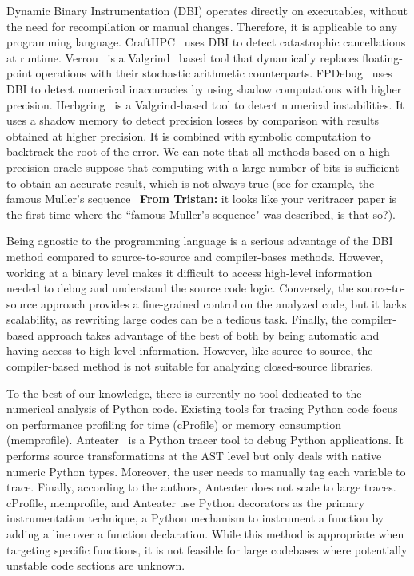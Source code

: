 \documentclass[11pt]{article}
\newcommand{\tristan}[1]{\color{orange}\textbf{From Tristan:} #1\color{black}\xspace}
\begin{document}
Dynamic Binary Instrumentation (DBI) operates directly on executables, without the need for recompilation or manual changes. Therefore, it is applicable to any programming language.
CraftHPC~\cite{lam2013dynamic} uses DBI to detect catastrophic cancellations at runtime.
Verrou~\cite{fevotte2016verrou} is a Valgrind~\cite{nethercote2007valgrind} based tool that dynamically replaces
floating-point operations with their stochastic arithmetic counterparts. FPDebug~\cite{benz2012dynamic} uses DBI to detect numerical inaccuracies by using shadow computations with higher precision.
Herbgring~\cite{sanchez2017finding} is a Valgrind-based tool to detect
numerical instabilities. It uses a shadow memory to detect precision losses by comparison with results obtained at higher precision. It is combined with symbolic computation to backtrack the root of the error.
We can note that all methods based on a high-precision oracle suppose that computing with a large number of bits is sufficient to obtain an accurate result, which is not always true (see for example, the famous Muller's sequence~\cite{chatelain2018veritracer} \tristan{it looks like your veritracer paper is the first time where the ``famous Muller's sequence" was described, is that so?}).

Being agnostic to the programming language is a serious advantage of the DBI method compared to source-to-source and compiler-bases methods. However, working at a binary level makes it difficult to access high-level information needed to debug and understand the source code logic. Conversely, the source-to-source approach provides a fine-grained control on the analyzed code, but it lacks scalability, as rewriting large codes can be a tedious task. Finally, the compiler-based approach takes advantage of the best of both by being automatic and having access to high-level information. However, like source-to-source, the compiler-based method is not suitable for analyzing closed-source libraries.

To the best of our knowledge, there is currently no tool dedicated to the numerical analysis of Python code. Existing tools for tracing Python code focus on  performance profiling for time (cProfile) 
or memory consumption (memprofile). 
Anteater~\cite{faust2019anteater} is a Python tracer tool to debug Python applications. 
It performs source transformations at the AST level but only deals with native numeric Python types.
Moreover, the user needs to manually tag each variable to trace. Finally, according to the authors, Anteater does not scale to large traces.
cProfile, memprofile, and Anteater use Python decorators as the primary instrumentation technique, a Python mechanism to instrument a function by adding a line over a function declaration.
While this method is appropriate when targeting specific functions, it is not feasible for large codebases where potentially unstable code sections are unknown.
\end{document}
